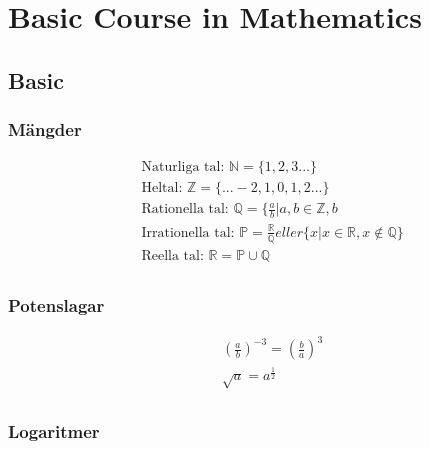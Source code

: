 \chapter{Basic Course in Mathematics}

\newpage

\section{Basic}
\subsection{Mängder}
\begin{align*}
  &\quad \text{Naturliga tal: } \mathbb{N} = \{ 1, 2 , 3 ...  \} \\
  &\quad \text{Heltal: }\mathbb{Z} = \{... -2, 1, 0, 1, 2 ...  \} \\
  &\quad \text{Rationella tal: }\mathbb{Q} = \{ \frac{a}{b} | a,b \in \mathbb{Z}, b \\
  &\quad \text{Irrationella tal: }\mathbb{P} = \frac{\mathbb{R}}{\mathbb{Q}}eller \{ x | x \in \mathbb{R}, x \notin \mathbb{Q} \} \\
  &\quad \text{Reella tal: }\mathbb{R} =  \mathbb{P} \cup \mathbb{Q} \\
\end{align*}


\subsection{Potenslagar}
\begin{align*}
  &\quad (\frac{a}{b})^{-3} = (\frac{b}{a})^{3}\\
  &\quad \sqrt{a} = a^{\frac{1}{2}} \\
\end{align*}


\subsection{Logaritmer}
%


